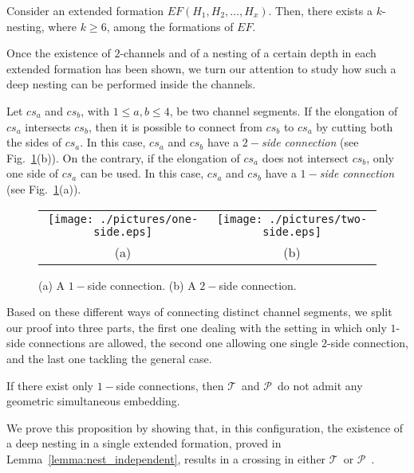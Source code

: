 \documentclass[a4paper,10pt]{llncs}
\newcounter{prop}
\newcommand{\T}{\mbox{$\mathcal T$ }}
\renewcommand{\P}{\mbox{$\mathcal P$ }}
\begin{document}
\begin{lemma}\label{lemma:nest_independent}
Consider an extended formation $EF(H_1,H_2,\ldots,H_x)$.
Then, there exists a $k$-nesting, where $k \geq 6$, among the formations of $EF$.
\end{lemma}

Once the existence of $2$-channels and of a nesting of a certain depth in each extended formation has been shown, we turn our attention to study how such a deep nesting can be performed inside the channels.

Let $cs_a$ and $cs_b$, with $1\leq a,b \leq 4$, be two channel segments. If the elongation of $cs_a$ intersects $cs_b$, then it is possible to connect from $cs_b$ to $cs_a$ by cutting both the sides of $cs_a$. In this case, $cs_a$ and $cs_b$ have a \emph{$2-$side connection} (see Fig.~\ref{fig:12-side-connection}(b)). On the contrary, if the elongation of $cs_a$ does not intersect $cs_b$, only one side of $cs_a$ can be used. In this case, $cs_a$ and $cs_b$ have a \emph{$1-$side connection} (see Fig.~\ref{fig:12-side-connection}(a)).

\begin{figure}[htb]
\begin{center}
\begin{tabular}{c c}
\mbox{\texttt{[image: ./pictures/one-side.eps]}} \hspace{1cm} &
\mbox{\texttt{[image: ./pictures/two-side.eps]}} \\
(a) & (b)\\
\end{tabular}
\caption{(a) A $1-$side connection. (b) A $2-$side connection.}
\label{fig:12-side-connection}
\end{center}
\end{figure}

Based on these different ways of connecting distinct channel segments, we split our proof into three parts, the first one dealing with the setting in which only $1$-side connections are allowed, the second one allowing one single $2$-side connection, and the last one tackling the general case.

\begin{proposition}\label{prop:only-1-side}
If there exist only $1-$side connections, then \T and \P do not admit any geometric simultaneous embedding.
\end{proposition}

We prove this proposition by showing that, in this configuration, the existence of a deep nesting in a single extended formation, proved in Lemma~\ref{lemma:nest_independent}, results in a crossing in either \T or \P.
\end{document}
